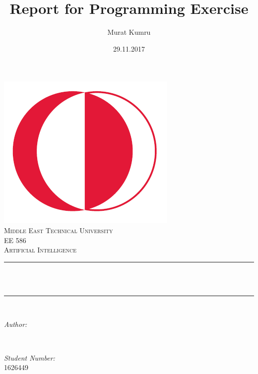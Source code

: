 \documentclass[12pt]{article}
\title{Report for Programming Exercise}								%
\author{Murat Kumru}								%
\date{29.11.2017}											%
\makeatletter
\let\thetitle\@title
\let\theauthor\@author
\let\thedate\@date
\makeatother
\begin{document}

\begin{titlepage}
	\centering
    \vspace*{0.5 cm}
    \includegraphics[scale = 0.3]{odtuLogo.png}\\[1.0 cm]	%
    \textsc{\LARGE Middle East Technical University}\\[2.0 cm]	%
	\textsc{\Large EE 586}\\[0.5 cm]				%
	\textsc{\large Artificial Intelligence}\\[0.5 cm]				%
	\rule{\linewidth}{0.2 mm} \\[0.4 cm]
	{ \huge \bfseries \thetitle}\\
	\rule{\linewidth}{0.2 mm} \\[1.5 cm]
	
	\begin{minipage}{0.4\textwidth}
		\begin{flushleft} \large
			\emph{Author:}\\
			\theauthor
			\end{flushleft}
			\end{minipage}~
			\begin{minipage}{0.4\textwidth}
			\begin{flushright} \large
			\emph{Student Number:} \\
			1626449									%
		\end{flushright}
	\end{minipage}\\[2 cm]
	
	{\large \thedate}\\[2 cm]
 
	\vfill
	
\end{titlepage}
\end{document}
